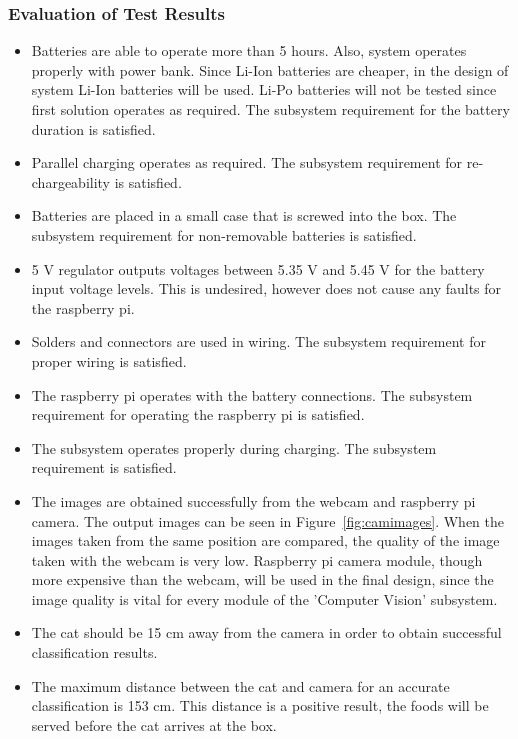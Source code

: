   \subsubsection{Evaluation of Test Results}
\begin{itemize}
\item Batteries are able to operate more than 5 hours. Also, system operates properly with power bank. Since Li-Ion batteries are cheaper, in the design of system Li-Ion batteries will be used. Li-Po batteries will not be tested since first solution operates as required. The subsystem requirement for the battery duration is satisfied.
\item Parallel charging operates as required. The subsystem requirement for re-chargeability is satisfied.
\item Batteries are placed in a small case that is screwed into the box. The subsystem requirement for non-removable batteries is satisfied.
\item 5 V regulator outputs voltages between 5.35 V and 5.45 V for the battery input voltage levels. This is undesired, however does not cause any faults for the raspberry pi.
\item Solders and connectors are used in wiring. The subsystem requirement for proper wiring is satisfied.
\item The raspberry pi operates with the battery connections. The subsystem requirement for operating the raspberry pi is satisfied.
\item The subsystem operates properly during charging. The subsystem requirement is satisfied.
\item The images are obtained successfully from the webcam and raspberry pi camera. The output images can be seen in Figure~\ref{fig:camimages}. When the images taken from the same position are compared, the quality of the image taken with the webcam is very low. Raspberry pi camera module, though more expensive than the webcam, will be used in the final design, since the image quality is vital for every module of the 'Computer Vision' subsystem.
\item The cat should be 15 cm away from the camera in order to obtain successful classification results.
\item The maximum distance between the cat and camera for an accurate classification is 153 cm. This distance is a positive result, the foods will be served before the cat arrives at the box.


\end{itemize}
